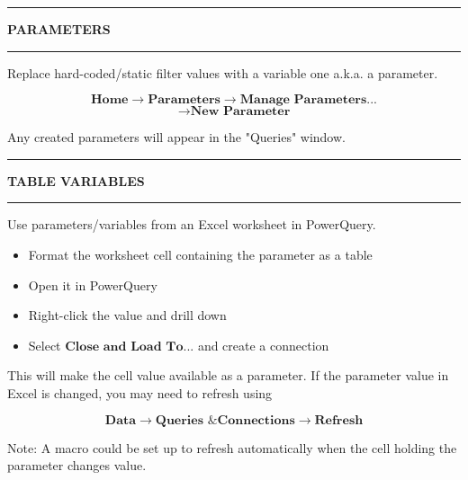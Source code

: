 \documentclass[8pt]{extarticle}
\newcommand{\heading}[1]{%
    \noindent
    \rule{\linewidth}{0.4pt}
    \begin{center}
        \vspace{-1ex}
        \textbf{#1}        
        \vspace{-2.5ex}
    \end{center}
    \rule{\linewidth}{0.4pt}
}
\begin{document}
\begin{multicols}{3}
\heading{PARAMETERS}

Replace hard-coded/static filter values with a variable one a.k.a. a parameter.

\[\textbf{Home} \rightarrow \textbf{Parameters} \rightarrow \textbf{Manage Parameters...} \]\[\rightarrow \textbf{New Parameter} \]

Any created parameters will appear in the "Queries" window.

\heading{TABLE VARIABLES}

Use parameters/variables from an Excel worksheet in PowerQuery. 

\begin{itemize}
    \item Format the worksheet cell containing the parameter as a table
    \item Open it in PowerQuery
    \item Right-click the value and drill down
    \item Select $\textbf{Close and Load To...}$ and create a connection
\end{itemize}

This will make the cell value available as a parameter. If the parameter value in Excel is changed, you may need to refresh using

\[\textbf{Data} \rightarrow \textbf{Queries \& Connections} \rightarrow \textbf{Refresh}\]

Note: A macro could be set up to refresh automatically when the cell holding the parameter changes value.




\end{multicols}
\end{document}
